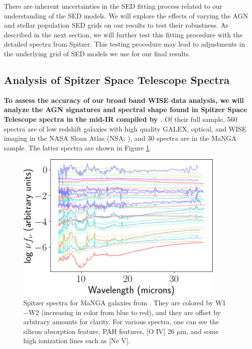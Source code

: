 \documentclass[12pt, preprint]{hacked-aastex}
\begin{document}
There are inherent uncertainties in the SED fitting process related to
our understanding of the SED models. We will explore the effects of
varying the AGN and stellar population SED grids on our results to
test their robustness.  As described in the next section, we will
further test this fitting procedure with the detailed spectra from
Spitzer. This testing procedure may lead to adjustments in the
underlying grid of SED models we use for our final results.


\subsection{Analysis of Spitzer Space Telescope Spectra}
\label{sec:spitzer}

{\bf To assess the accuracy of our broad band WISE data analysis, we
  will analyze the AGN signatures and spectral shape found in Spitzer
  Space Telescope spectra in the mid-IR compiled by \cite{lambrides19a}.}
Of their full sample, 560 spectra are of low redshift galaxies with
high quality GALEX, optical, and WISE imaging in the NASA Sloan Atlas
(NSA; \cite{blanton11a}), and 30 spectra are in the MaNGA sample.  The
latter spectra are shown in Figure \ref{fig:spitzer}.

\begin{figure}[t!]
\includegraphics[width=0.92\textwidth]{all-spitzer.png}
    \caption{
\label{fig:spitzer} \small Spitzer spectra for MaNGA galaxies
from \cite{lambrides19a}. They are colored by W1$-$W2 (increasing
in color from blue to red), and they are offset by arbitrary
amounts for clarity. For various spectra, one can see 
the silicon absorption  feature, PAH features, [O IV] 26 $\mu$m, 
and some high ionization lines such as [Ne V].
}
\end{figure}
\end{document}
